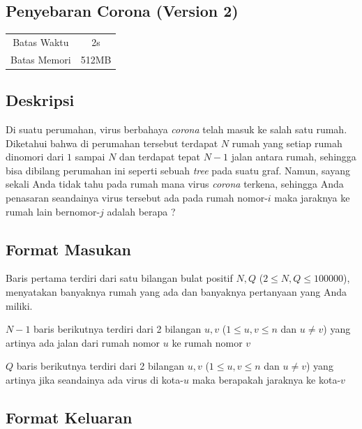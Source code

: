 \documentclass{article}
\begin{document}
\begin{center}
    \section*{Penyebaran Corona (Version 2)} %

    \begin{tabular}{ | c c | }
        \hline
        Batas Waktu  & 2s \\    %
        Batas Memori & 512MB \\  %
        \hline
    \end{tabular}
\end{center}

\subsection*{Deskripsi}

Di suatu perumahan, virus berbahaya \textit{corona} telah masuk ke salah satu rumah. Diketahui bahwa di perumahan tersebut terdapat $N$ rumah yang setiap rumah dinomori dari $1$ sampai $N$ dan terdapat tepat $N - 1$ jalan antara rumah, sehingga bisa dibilang perumahan ini seperti sebuah \textit{tree} pada suatu graf. Namun, sayang sekali Anda tidak tahu pada rumah mana virus \textit{corona} terkena, sehingga Anda penasaran seandainya virus tersebut ada pada rumah nomor-$i$ maka jaraknya ke rumah lain bernomor-$j$ adalah berapa ?

\subsection*{Format Masukan}

Baris pertama terdiri dari satu bilangan bulat positif $N, Q$ ($2 \leq N, Q \leq 100000$), menyatakan banyaknya rumah yang ada dan banyaknya pertanyaan yang Anda miliki.

$N-1$ baris berikutnya terdiri dari 2 bilangan $u, v$ ($1 \leq u, v \leq n$ dan $u \neq v$) yang artinya ada jalan dari rumah nomor $u$ ke rumah nomor $v$

$Q$ baris berikutnya terdiri dari 2 bilangan $u, v$ ($1 \leq u, v \leq n$ dan $u \neq v$) yang artinya jika seandainya ada virus di kota-$u$ maka berapakah jaraknya ke kota-$v$

\subsection*{Format Keluaran}
\end{document}

